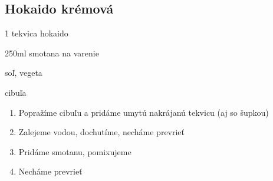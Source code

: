 \setcounter{step}{0}
\subsection{Hokaido krémová}

\begin{ingredient}
\def\portions{4}%

\begin{main}
	\item 1 tekvica hokaido
	\item 250ml smotana na varenie
	\item soľ, vegeta
	\item cibuľa
\end{main}
\end{ingredient}
\begin{recipe}

\begin{enumerate}



\item{Popražíme cibuľu a pridáme umytú nakrájanú tekvicu (aj so šupkou)}
\item{Zalejeme vodou, dochutíme, necháme prevrieť}
\item{Pridáme smotanu, pomixujeme}
\item{Necháme prevrieť}

\end{enumerate}
\end{recipe}

\begin{notes}

\end{notes}	
\clearpage